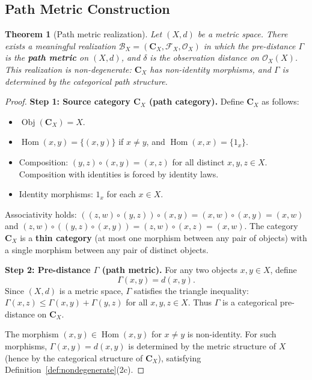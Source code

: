 \documentclass[11pt,a4paper]{article}
\newtheorem{theorem}{Theorem}[section]
\begin{document}
\subsection{Path Metric Construction}

\begin{theorem}[Path metric realization]\label{thm:path-metric}
Let $(X,d)$ be a metric space. There exists a meaningful realization
$\mathcal{B}_X=(\mathbf{C}_X,\mathcal{F}_X,\mathcal{O}_X)$ in which the
pre-distance $\Gamma$ is the \textbf{path metric} on $(X,d)$, and
$\delta$ is the observation distance on $\mathcal{O}_X(X)$. This realization
is non-degenerate: $\mathbf{C}_X$ has non-identity morphisms, and
$\Gamma$ is determined by the categorical path structure.
\end{theorem}

\begin{proof}
\noindent\textbf{Step 1: Source category $\mathbf{C}_X$ (path category).}
Define $\mathbf{C}_X$ as follows:
\begin{itemize}
\item $\operatorname{Obj}(\mathbf{C}_X)=X$.
\item $\operatorname{Hom}(x,y)=\{(x,y)\}$ if $x\neq y$, and
$\operatorname{Hom}(x,x)=\{1_x\}$.
\item Composition: $(y,z)\circ(x,y)=(x,z)$ for all distinct $x,y,z\in X$.
Composition with identities is forced by identity laws.
\item Identity morphisms: $1_x$ for each $x\in X$.
\end{itemize}

Associativity holds: $((z,w)\circ(y,z))\circ(x,y)=(x,w)\circ(x,y)=(x,w)$
and $(z,w)\circ((y,z)\circ(x,y))=(z,w)\circ(x,z)=(x,w)$.
The category $\mathbf{C}_X$ is a \textbf{thin category} (at most one morphism
between any pair of objects) with a single morphism between any pair of
distinct objects.

\noindent\textbf{Step 2: Pre-distance $\Gamma$ (path metric).}
For any two objects $x,y\in X$, define
\begin{equation}
\Gamma(x,y)=d(x,y).
\end{equation}
Since $(X,d)$ is a metric space, $\Gamma$ satisfies the triangle inequality:
$\Gamma(x,z)\leq\Gamma(x,y)+\Gamma(y,z)$ for all $x,y,z\in X$. Thus $\Gamma$
is a categorical pre-distance on $\mathbf{C}_X$.

The morphism $(x,y)\in\operatorname{Hom}(x,y)$ for $x\neq y$ is non-identity.
For such morphisms, $\Gamma(x,y)=d(x,y)$ is determined by the metric
structure of $X$ (hence by the categorical structure of $\mathbf{C}_X$),
satisfying Definition~\ref{def:nondegenerate}(2c).


\end{proof}
\end{document}
